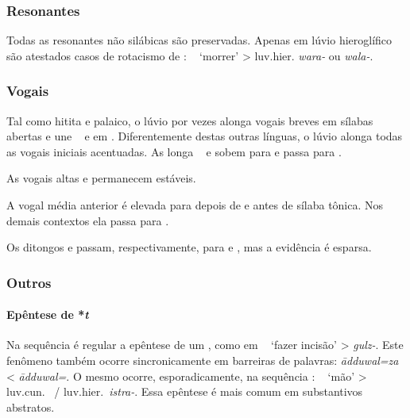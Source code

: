 \subsubsection{Resonantes}

Todas as resonantes não silábicas são preservadas.
Apenas em lúvio hieroglífico são atestados casos de rotacismo de
: \pac~ `morrer' > luv.hier.
\emph{wara-} ou \emph{wala-}.

\subsubsection{Vogais}

Tal como hitita e palaico, o lúvio por vezes alonga vogais breves em sílabas
abertas e une \pac~ e  em .
Diferentemente destas outras línguas, o lúvio alonga todas as vogais iniciais
acentuadas.
As longa \pac~ e  sobem para 
e  passa para .

As vogais altas  e  permanecem estáveis.

A vogal média anterior  é elevada para  depois
de  e antes de sílaba tônica.
Nos demais contextos ela passa para .

Os ditongos  e 
passam, respectivamente, para  e , mas a
evidência é esparsa.

\subsubsection{Outros}

\paragraph{Epêntese de *\emph{t}} Na sequência  é regular a
epêntese de um , como em \pac~
`fazer incisão' > \emph{gulz-}.
Este fenômeno também ocorre sincronicamente em barreiras de palavras:
\emph{ādduwal=za} < \emph{ādduwal=}.
O mesmo ocorre, esporadicamente, na sequência :
\pac~ `mão' >
luv.cun.\ \emph{} \slash{} luv.hier.\ \emph{istra-}.
Essa epêntese é mais comum em substantivos abstratos.

